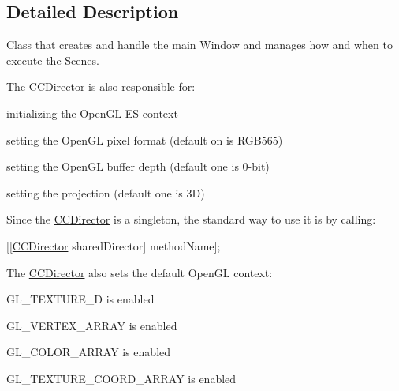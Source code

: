 \subsection{Detailed Description}
Class that creates and handle the main Window and manages how and when to execute the Scenes.

The \hyperlink{class_c_c_director}{C\-C\-Director} is also responsible for\-:
\begin{DoxyItemize}
\item initializing the Open\-G\-L E\-S context
\item setting the Open\-G\-L pixel format (default on is R\-G\-B565)
\item setting the Open\-G\-L buffer depth (default one is 0-\/bit)
\item setting the projection (default one is 3\-D)
\end{DoxyItemize}

Since the \hyperlink{class_c_c_director}{C\-C\-Director} is a singleton, the standard way to use it is by calling\-:
\begin{DoxyItemize}
\item \mbox{[}\mbox{[}\hyperlink{class_c_c_director}{C\-C\-Director} shared\-Director\mbox{]} method\-Name\mbox{]};
\end{DoxyItemize}

The \hyperlink{class_c_c_director}{C\-C\-Director} also sets the default Open\-G\-L context\-:
\begin{DoxyItemize}
\item G\-L\-\_\-\-T\-E\-X\-T\-U\-R\-E\-\_\-D is enabled
\item G\-L\-\_\-\-V\-E\-R\-T\-E\-X\-\_\-\-A\-R\-R\-A\-Y is enabled
\item G\-L\-\_\-\-C\-O\-L\-O\-R\-\_\-\-A\-R\-R\-A\-Y is enabled
\item G\-L\-\_\-\-T\-E\-X\-T\-U\-R\-E\-\_\-\-C\-O\-O\-R\-D\-\_\-\-A\-R\-R\-A\-Y is enabled 
\end{DoxyItemize}

